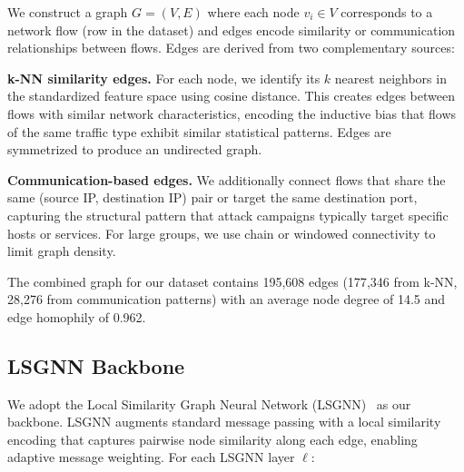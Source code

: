 \documentclass[conference]{IEEEtran}
\begin{document}
We construct a graph $G = (V, E)$ where each node $v_i \in V$ corresponds to a network flow (row in the dataset) and edges encode similarity or communication relationships between flows. Edges are derived from two complementary sources:

\textbf{k-NN similarity edges.} For each node, we identify its $k$ nearest neighbors in the standardized feature space using cosine distance. This creates edges between flows with similar network characteristics, encoding the inductive bias that flows of the same traffic type exhibit similar statistical patterns. Edges are symmetrized to produce an undirected graph.

\textbf{Communication-based edges.} We additionally connect flows that share the same (source IP, destination IP) pair or target the same destination port, capturing the structural pattern that attack campaigns typically target specific hosts or services. For large groups, we use chain or windowed connectivity to limit graph density.

The combined graph for our dataset contains 195{,}608 edges (177{,}346 from k-NN, 28{,}276 from communication patterns) with an average node degree of 14.5 and edge homophily of 0.962.

\subsection{LSGNN Backbone}

We adopt the Local Similarity Graph Neural Network (LSGNN)~\cite{wu2023lsgnn} as our backbone. LSGNN augments standard message passing with a local similarity encoding that captures pairwise node similarity along each edge, enabling adaptive message weighting. For each LSGNN layer $\ell$:
\end{document}
